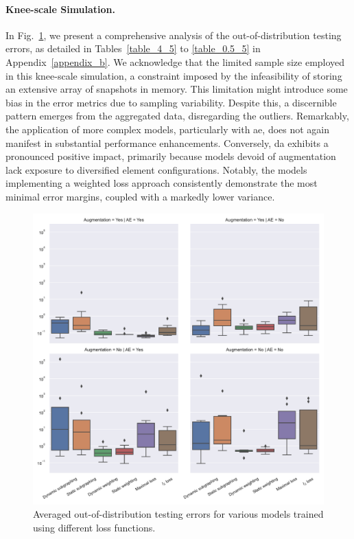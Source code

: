 \documentclass[12pt,a4paper]{report}
\begin{document}
\paragraph{Knee-scale Simulation.} In Fig.~\ref{fig:3d_boxplot}, we present a comprehensive analysis of the out-of-distribution testing errors, as detailed in Tables~\ref{table_4_5} to \ref{table_0.5_5} in Appendix~\ref{appendix_b}. We acknowledge that the limited sample size employed in this knee-scale simulation, a constraint imposed by the infeasibility of storing an extensive array of snapshots in memory. This limitation might introduce some bias in the error metrics due to sampling variability. Despite this, a discernible pattern emerges from the aggregated data, disregarding the outliers. Remarkably, the application of more complex models, particularly with \ac{ae}, does not again manifest in substantial performance enhancements. Conversely, \ac{da} exhibits a pronounced positive impact, primarily because models devoid of augmentation lack exposure to diversified element configurations. Notably, the models implementing a weighted loss approach consistently demonstrate the most minimal error margins, coupled with a markedly lower variance.
%
\begin{figure}\centering
\includegraphics[width=1\linewidth,keepaspectratio]{3d_boxplot.pdf}
\caption{Averaged out-of-distribution testing errors for various models trained using different loss functions.}\label{fig:3d_boxplot}
\end{figure}
\end{document}
